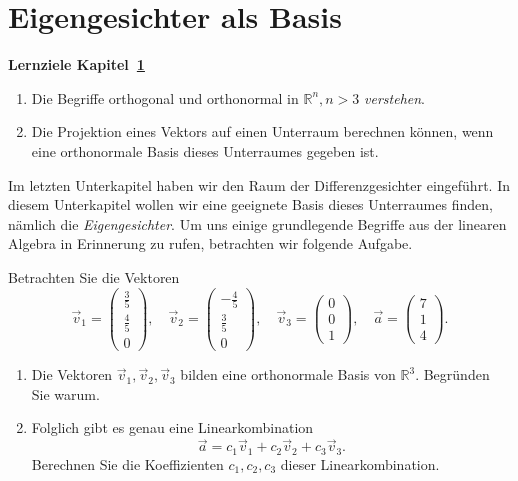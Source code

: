 \section{Eigengesichter als Basis} \label{sec:eigenbasis}
\begin{tcolorbox}
	\centerline{\textbf{Lernziele Kapitel~\ref{sec:eigenbasis}}}
	\begin{enumerate}[leftmargin=*]
		\item Die Begriffe \glqq{}orthogonal\grqq{} und \glqq{}orthonormal\grqq{} in $\mathbb R^n,n>3$ \textit{verstehen}.
		\item Die Projektion eines Vektors auf einen Unterraum berechnen können, wenn eine orthonormale Basis dieses Unterraumes gegeben ist.
	\end{enumerate}
\end{tcolorbox}
Im letzten Unterkapitel haben wir den Raum der Differenzgesichter eingeführt.
In diesem Unterkapitel wollen wir eine geeignete Basis dieses Unterraumes finden, nämlich die \textit{Eigengesichter}.
Um uns einige grundlegende Begriffe aus der linearen Algebra in Erinnerung zu rufen, betrachten wir folgende Aufgabe.
\begin{aufgabe}
	Betrachten Sie die Vektoren
	\begin{equation*}
		\vec v_1=\begin{pmatrix}
			\tfrac{3}{5} \\ \tfrac{4}{5} \\ 0
		\end{pmatrix},\quad
		\vec v_2=\begin{pmatrix}
			-\tfrac{4}{5} \\ \tfrac{3}{5} \\  0
		\end{pmatrix},\quad
		\vec v_3=\begin{pmatrix}
			0 \\ 0 \\  1
		\end{pmatrix},\quad
		\vec a=\begin{pmatrix}
			7 \\ 1 \\  4
		\end{pmatrix}.
	\end{equation*}
	\begin{enumerate}[label=(\alph*)]
		\item Die Vektoren $\vec v_1,\vec v_2,\vec v_3$ bilden eine orthonormale Basis von $\mathbb R^3$.
		Begründen Sie warum.
		\item Folglich gibt es genau eine Linearkombination
		\begin{equation*}
			\vec a=c_1\vec v_1+c_2\vec v_2+c_3\vec v_3.
		\end{equation*}
		Berechnen Sie die Koeffizienten $c_1,c_2,c_3$ dieser Linearkombination.
	\end{enumerate}
\end{aufgabe}
